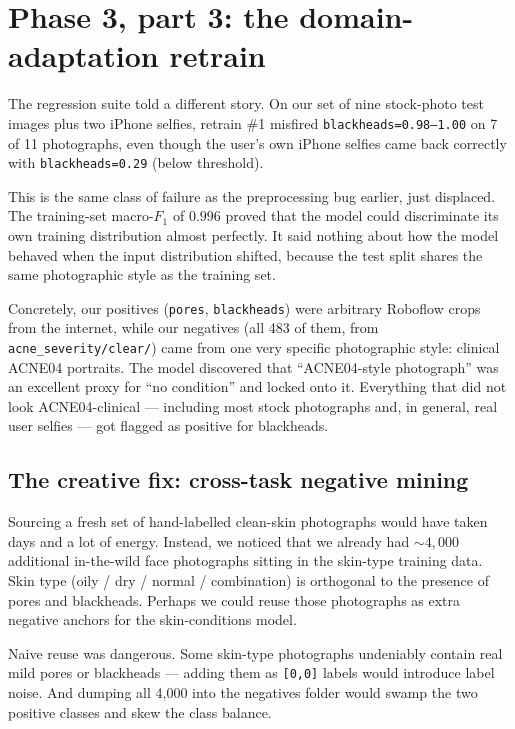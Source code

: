 \documentclass[11pt,a4paper,oneside]{report}
\begin{document}
\section{Phase 3, part 3: the domain-adaptation retrain}\label{sec:domain-adaptation}

The regression suite told a different story. On our set of nine
stock-photo test images plus two iPhone selfies, retrain \#1
misfired \texttt{blackheads=0.98--1.00} on 7 of 11 photographs, even
though the user's own iPhone selfies came back correctly with
\texttt{blackheads=0.29} (below threshold).

This is the same class of failure as the preprocessing bug earlier,
just displaced. The training-set macro-\(F_1\) of \(0.996\) proved
that the model could discriminate its own training distribution
almost perfectly. It said nothing about how the model behaved when
the input distribution shifted, because the test split shares the
same photographic style as the training set.

Concretely, our positives (\texttt{pores}, \texttt{blackheads})
were arbitrary Roboflow crops from the internet, while our
negatives (all 483 of them, from \texttt{acne\_severity/clear/})
came from one very specific photographic style: clinical ACNE04
portraits. The model discovered that ``ACNE04-style photograph''
was an excellent proxy for ``no condition'' and locked onto it.
Everything that did not look ACNE04-clinical --- including most
stock photographs and, in general, real user selfies --- got
flagged as positive for blackheads.

\subsection{The creative fix: cross-task negative mining}

Sourcing a fresh set of hand-labelled clean-skin photographs would
have taken days and a lot of energy. Instead, we noticed that we
already had \(\sim 4{,}000\) additional in-the-wild face photographs
sitting in the skin-type training data. Skin type (oily / dry /
normal / combination) is orthogonal to the presence of pores and
blackheads. Perhaps we could reuse those photographs as extra
negative anchors for the skin-conditions model.

Naive reuse was dangerous. Some skin-type photographs undeniably
contain real mild pores or blackheads --- adding them as
\texttt{[0,0]} labels would introduce label noise. And dumping all
4{,}000 into the negatives folder would swamp the two positive
classes and skew the class balance.
\end{document}
